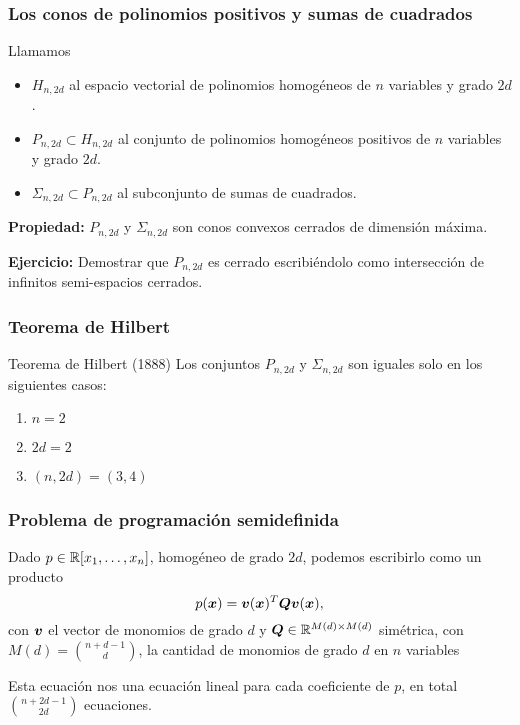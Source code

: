 \documentclass[aspectratio=169,12pt,spanish]{beamer}
\begin{document}


\begin{frame}
\frametitle{Los conos de polinomios positivos y sumas de cuadrados}

Llamamos
\begin{itemize}
\item $H_{n,2d}$ al espacio vectorial de polinomios homog\'eneos de $n$ variables y grado $2d$.
\item $P_{n,2d} \subset H_{n,2d}$ al conjunto de polinomios homog\'eneos positivos de $n$ variables y grado $2d$.
\item $\Sigma_{n,2d} \subset P_{n,2d}$ al subconjunto de sumas de cuadrados.
\end{itemize}

\textbf{Propiedad:} $P_{n,2d}$ y $\Sigma_{n,2d}$ son conos convexos cerrados de dimensión máxima.

\textbf{Ejercicio:} Demostrar que $P_{n,2d}$ es cerrado escribiéndolo como intersección de infinitos semi-espacios cerrados.
\end{frame}



\begin{frame}
\frametitle{Teorema de Hilbert}


\begin{theorem}{Teorema de Hilbert (1888)}
Los conjuntos $P_{n,2d}$ y $\Sigma_{n,2d}$ son iguales solo en los siguientes casos:

\begin{enumerate}
 \item $n = 2$
 \item $2d=2$
 \item $(n,2d) = (3,4)$
\end{enumerate}
\end{theorem}

\end{frame}




\begin{frame}
\frametitle{Problema de programaci\'on semidefinida}
Dado $p \in \mathbb{R}[x_1, \dots, x_n]$, homog\'eneo de grado $2d$, podemos escribirlo como un producto
\[
p(\bm{x}) = \bm{v}(\bm{x})^T \bm{Q} \bm{v}(\bm{x}),
\]
con $\bm{v}$ el vector de monomios de grado $d$ y $\bm{Q} \in \mathbb{R}^{M(d) \times M(d)}$ sim\'etrica, con $M(d) =  \binom{n+d-1}{d}$, la cantidad de monomios de grado $d$ en $n$ variables

Esta ecuación nos una ecuación lineal para cada coeficiente de $p$, en total $\binom{n+2d-1}{2d}$ ecuaciones.

\end{frame}
\end{document}
